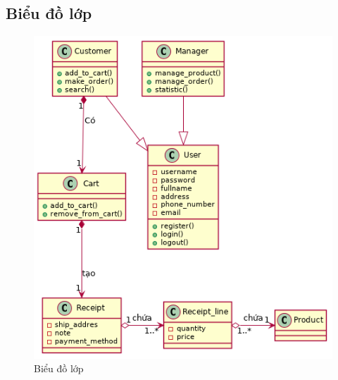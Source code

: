 \subsection{Biểu đồ lớp}
\begin{figure}[h!]
	\centering
	\includegraphics[scale=0.7]{fig/class.png}
	\caption{Biểu đồ lớp}
\end{figure}
\newpage
